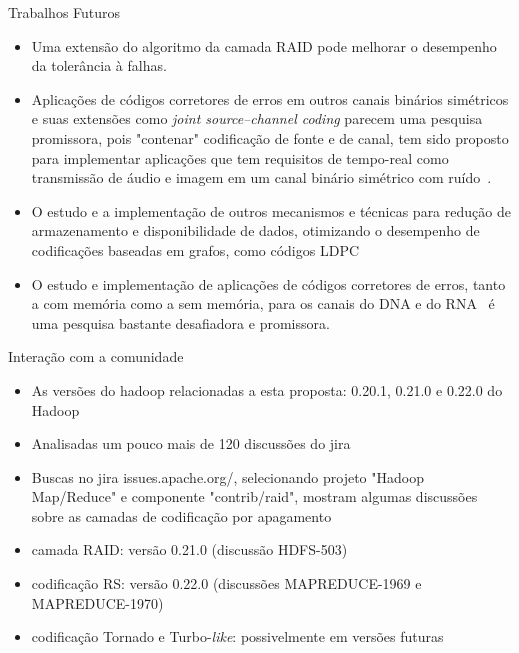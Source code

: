 \begin{frame}{Trabalhos Futuros}
   \begin{itemize}

        \item Uma extensão do algoritmo da camada RAID pode melhorar o desempenho da tolerância à falhas.

        \item Aplicações de códigos corretores de erros em outros canais binários simétricos e suas extensões como \emph{joint source–channel coding} parecem uma pesquisa promissora, pois "contenar" codificação de fonte e de canal, tem sido proposto para implementar aplicações que tem requisitos de tempo-real como transmissão de áudio e imagem em um canal binário simétrico com ruído~\cite{JSCC:2012}.

        \item O estudo e a implementação de outros mecanismos e técnicas para redução de armazenamento e disponibilidade de dados, otimizando o desempenho de codificações baseadas em grafos, como códigos LDPC

        \item O estudo e implementação de aplicações de códigos corretores de erros, tanto a com memória como a sem memória, para os canais do DNA e do RNA~\cite{Rocha:2010,Faria:2012} é uma pesquisa bastante desafiadora e promissora.

  \end{itemize}

\end{frame}

 \begin{frame}{Interação com a comunidade}
   \begin{itemize}
      \item As versões do hadoop relacionadas a esta proposta: 0.20.1, 0.21.0 e 0.22.0 do Hadoop
      \item Analisadas um pouco mais de 120 discussões do jira
      \item Buscas no jira issues.apache.org/, selecionando projeto "Hadoop Map/Reduce" e componente "contrib/raid", mostram algumas discussões sobre as camadas de codificação por apagamento
      \item camada RAID: versão 0.21.0 (discussão HDFS-503)
      \item codificação RS: versão 0.22.0 (discussões MAPREDUCE-1969 e MAPREDUCE-1970)
      \item codificação Tornado e Turbo-\emph{like}: possivelmente em versões futuras
   \end{itemize}
 \end{frame}

